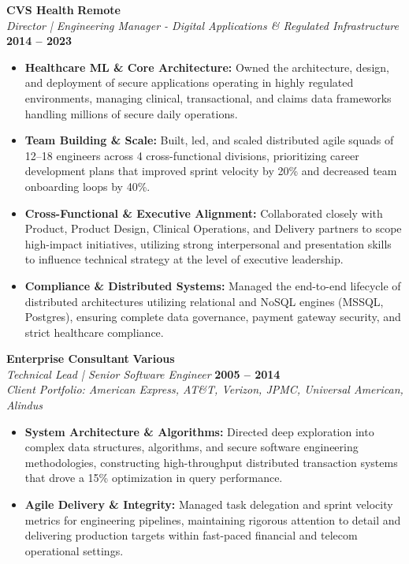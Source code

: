 \documentclass[9pt, letterpaper]{extarticle}
\begin{document}
\textbf{CVS Health} \hfill \textbf{Remote} \\
\textit{Director | Engineering Manager - Digital Applications \& Regulated Infrastructure} \hfill \textbf{2014 -- 2023}
\begin{itemize}
    \item \textbf{Healthcare ML \& Core Architecture:} Owned the architecture, design, and deployment of secure applications operating in highly regulated environments, managing clinical, transactional, and claims data frameworks handling millions of secure daily operations.
    \item \textbf{Team Building \& Scale:} Built, led, and scaled distributed agile squads of 12--18 engineers across 4 cross-functional divisions, prioritizing career development plans that improved sprint velocity by 20\% and decreased team onboarding loops by 40\%.
    \item \textbf{Cross-Functional \& Executive Alignment:} Collaborated closely with Product, Product Design, Clinical Operations, and Delivery partners to scope high-impact initiatives, utilizing strong interpersonal and presentation skills to influence technical strategy at the level of executive leadership.
    \item \textbf{Compliance \& Distributed Systems:} Managed the end-to-end lifecycle of distributed architectures utilizing relational and NoSQL engines (MSSQL, Postgres), ensuring complete data governance, payment gateway security, and strict healthcare compliance.
\end{itemize}

\vspace{6pt}

\textbf{Enterprise Consultant} \hfill \textbf{Various} \\
\textit{Technical Lead | Senior Software Engineer} \hfill \textbf{2005 -- 2014} \\
\small\textit{Client Portfolio: American Express, AT\&T, Verizon, JPMC, Universal American, Alindus}
\begin{itemize}
    \item \textbf{System Architecture \& Algorithms:} Directed deep exploration into complex data structures, algorithms, and secure software engineering methodologies, constructing high-throughput distributed transaction systems that drove a 15\% optimization in query performance.
    \item \textbf{Agile Delivery \& Integrity:} Managed task delegation and sprint velocity metrics for engineering pipelines, maintaining rigorous attention to detail and delivering production targets within fast-paced financial and telecom operational settings.
\end{itemize}
\end{document}
